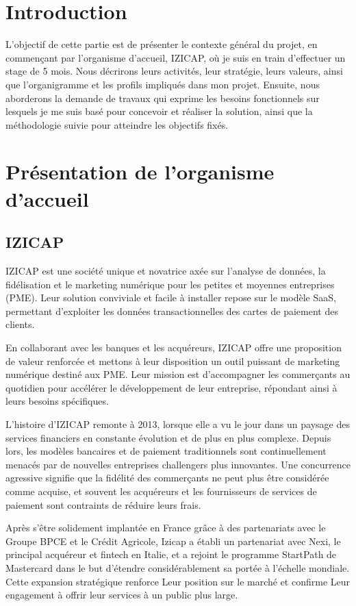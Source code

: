 
\section{Introduction}
L'objectif de cette partie est de présenter le contexte général du projet, en commençant par l'organisme d'accueil, IZICAP, où je suis en train d'effectuer un stage de 5 mois. Nous décrirons leurs activités, leur stratégie, leurs valeurs, ainsi que l'organigramme et les profils impliqués dans mon projet. Ensuite, nous aborderons la demande de travaux qui exprime les besoins fonctionnels sur lesquels je me suis basé pour concevoir et réaliser la solution, ainsi que la méthodologie suivie pour atteindre les objectifs fixés.

\section{Présentation de l’organisme d’accueil}
\subsection{IZICAP}
IZICAP est une société unique et novatrice axée sur l'analyse de données, la fidélisation et le marketing numérique pour les petites et moyennes entreprises (PME). Leur solution conviviale et facile à installer repose sur le modèle SaaS, permettant d'exploiter les données transactionnelles des cartes de paiement des clients.

En collaborant avec les banques et les acquéreurs, IZICAP offre une proposition de valeur renforcée et mettons à leur disposition un outil puissant de marketing numérique destiné aux PME. Leur mission est d'accompagner les commerçants au quotidien pour accélérer le développement de leur entreprise, répondant ainsi à leurs besoins spécifiques.

L'histoire d'IZICAP remonte à 2013, lorsque elle a vu le jour dans un paysage des services financiers en constante évolution et de plus en plus complexe. Depuis lors, les modèles bancaires et de paiement traditionnels sont continuellement menacés par de nouvelles entreprises challengers plus innovantes. Une concurrence agressive signifie que la fidélité des commerçants ne peut plus être considérée comme acquise, et souvent les acquéreurs et les fournisseurs de services de paiement sont contraints de réduire leurs frais.

Après s'être solidement implantée en France grâce à des partenariats avec le Groupe BPCE et le Crédit Agricole, Izicap a établi un partenariat avec Nexi, le principal acquéreur et fintech en Italie, et a rejoint le programme StartPath de Mastercard dans le but d'étendre considérablement sa portée à l'échelle mondiale. Cette expansion stratégique renforce Leur position sur le marché et confirme Leur engagement à offrir leur services à un public plus large.


